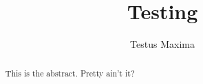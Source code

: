 \documentclass[]{article}
\title{Testing}
\author{Testus Maxima}
\begin{document}
\maketitle

\begin{abstract}
This is the abstract. Pretty ain't it?
\end{abstract}

\section{}
\end{document}

